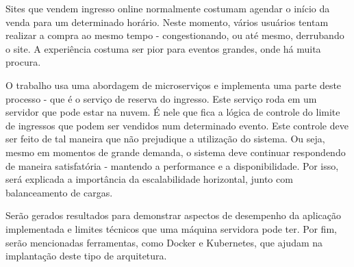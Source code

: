 
Sites que vendem ingresso online normalmente costumam agendar o início da venda
para um determinado horário.
Neste momento, vários usuários tentam realizar a compra ao mesmo tempo
- congestionando, ou até mesmo, derrubando o site.
A experiência costuma ser pior para eventos grandes, onde há muita procura.

O trabalho usa uma abordagem de microserviços e implementa uma parte deste
processo - que é o serviço de reserva do ingresso.
Este serviço roda em um servidor que pode estar na nuvem.
É nele que fica a lógica de controle do limite de ingressos que podem
ser vendidos num determinado evento.
Este controle deve ser feito de tal maneira que não prejudique a utilização
do sistema.
Ou seja, mesmo em momentos de grande demanda, o sistema deve continuar
respondendo de maneira satisfatória - mantendo a performance e a disponibilidade.
Por isso, será explicada a importância da escalabilidade horizontal,
junto com balanceamento de cargas.

Serão gerados resultados para demonstrar aspectos de desempenho da aplicação
implementada e limites técnicos que uma máquina servidora pode ter. Por fim,
serão mencionadas ferramentas, como Docker e Kubernetes, que ajudam na
implantação deste tipo de arquitetura.

